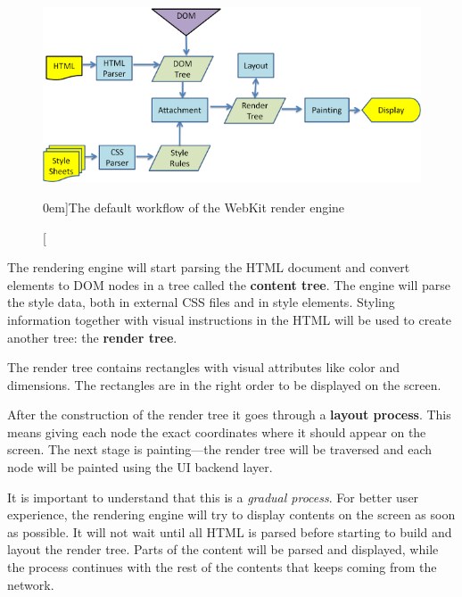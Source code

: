 \documentclass[a4paper, justified, notoc]{tufte-handout} %
\begin{document}
\begin{figure}%
	\centering
  \includegraphics[width=1.0\textwidth]{./figures/webkit_main_flow.png}
  \caption[][0em]{The default workflow of the WebKit render engine}
  \label{fig:webkit_main_flow}
\end{figure}

The rendering engine will start parsing the HTML document and convert elements to DOM nodes in a tree called the \textbf{content tree}. The engine will parse the style data, both in external CSS files and in style elements. Styling information together with visual instructions in the HTML will be used to create another tree: the \textbf{render tree}.

The render tree contains rectangles with visual attributes like color and dimensions. The rectangles are in the right order to be displayed on the screen.

After the construction of the render tree it goes through a \textbf{layout process}. This means giving each node the exact coordinates where it should appear on the screen. The next stage is painting---the render tree will be traversed and each node will be painted using the UI backend layer.

It is important to understand that this is a \emph{gradual process}. For better user experience, the rendering engine will try to display contents on the screen as soon as possible. It will not wait until all HTML is parsed before starting to build and layout the render tree. Parts of the content will be parsed and displayed, while the process continues with the rest of the contents that keeps coming from the network.
\end{document}
